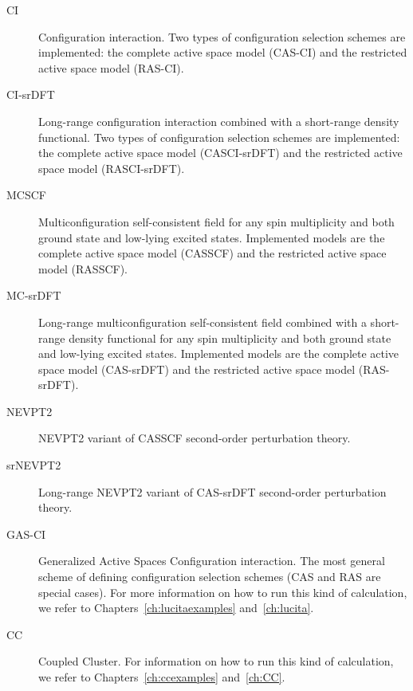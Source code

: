 \begin{description}
\item[CI] Configuration interaction.
Two types of configuration selection schemes are implemented: the complete active
space model (CAS-CI) and the restricted active space model (RAS-CI).

\item[CI-srDFT] Long-range configuration interaction combined with a short-range density functional.
Two types of configuration selection schemes are implemented: the complete active
space model (CASCI-srDFT) and the restricted active space model (RASCI-srDFT).

\item[MCSCF] Multiconfiguration self-consistent field for any spin multiplicity
and both ground state and low-lying excited states.
Implemented models are the complete active space model (CASSCF) and
the restricted active space model (RASSCF).

\item[MC-srDFT] Long-range multiconfiguration self-consistent field combined with a short-range density functional for any spin multiplicity
and both ground state and low-lying excited states.
Implemented models are the complete active space model (CAS-srDFT) and
the restricted active space model (RAS-srDFT).

\item[NEVPT2] NEVPT2 variant of CASSCF second-order perturbation theory.

\item[srNEVPT2] Long-range NEVPT2 variant of CAS-srDFT second-order perturbation theory.

\item[GAS-CI] Generalized Active Spaces Configuration interaction.
The most general scheme of defining configuration selection schemes (CAS and RAS are special cases).
For more information on how to run this kind of calculation, we refer to
Chapters~\ref{ch:lucitaexamples} and~\ref{ch:lucita}.

\item[CC] Coupled Cluster.
For information on how to run this kind of calculation, we refer to 
Chapters~\ref{ch:ccexamples} and~\ref{ch:CC}.

\end{description}


